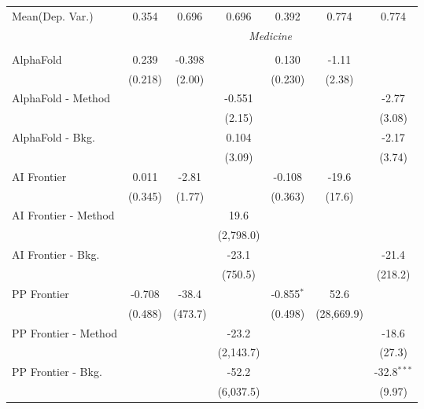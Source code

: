 \begin{tabular}{lcccccc}
Mean(Dep. Var.) & 0.354 & 0.696 & 0.696 & 0.392 & 0.774 & 0.774 \\
 & \multicolumn{6}{c}{\textit{Medicine}} \\ \\
   AlphaFold            & 0.239   & -0.398  &           & 0.130        & -1.11      &   \\   
                        & (0.218) & (2.00)  &           & (0.230)      & (2.38)     &   \\   
   AlphaFold - Method   &         &         & -0.551    &              &            & -2.77\\   
                        &         &         & (2.15)    &              &            & (3.08)\\   
   AlphaFold - Bkg.     &         &         & 0.104     &              &            & -2.17\\   
                        &         &         & (3.09)    &              &            & (3.74)\\   
   AI Frontier          & 0.011   & -2.81   &           & -0.108       & -19.6      &   \\   
                        & (0.345) & (1.77)  &           & (0.363)      & (17.6)     &   \\   
   AI Frontier - Method &         &         & 19.6      &              &            &   \\   
                        &         &         & (2,798.0) &              &            &   \\   
   AI Frontier - Bkg.   &         &         & -23.1     &              &            & -21.4\\   
                        &         &         & (750.5)   &              &            & (218.2)\\   
   PP Frontier          & -0.708  & -38.4   &           & -0.855$^{*}$ & 52.6       &   \\   
                        & (0.488) & (473.7) &           & (0.498)      & (28,669.9) &   \\   
   PP Frontier - Method &         &         & -23.2     &              &            & -18.6\\   
                        &         &         & (2,143.7) &              &            & (27.3)\\   
   PP Frontier - Bkg.   &         &         & -52.2     &              &            & -32.8$^{***}$\\   
                        &         &         & (6,037.5) &              &            & (9.97)\\   

\end{tabular}
